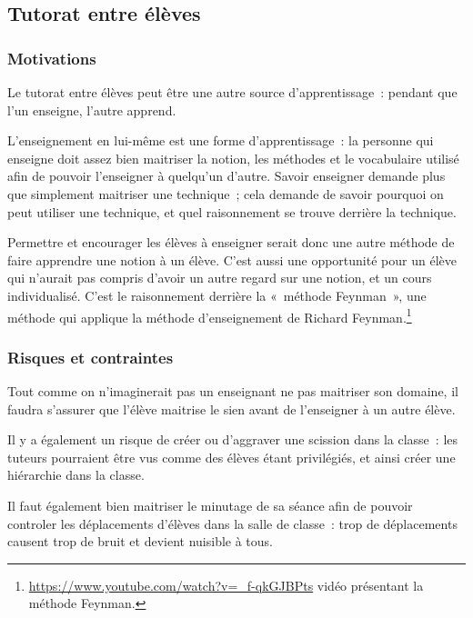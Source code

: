 \subsection{Tutorat entre élèves}
\subsubsection{Motivations}
Le tutorat entre élèves peut être une autre source d'apprentissage : pendant que
l'un enseigne, l'autre apprend.

L'enseignement en lui-même est une forme d'apprentissage : la personne qui
enseigne doit assez bien maitriser la notion, les méthodes et le vocabulaire
utilisé afin de pouvoir l'enseigner à quelqu'un d'autre. Savoir enseigner
demande plus que simplement maitriser une technique ; cela demande de savoir
pourquoi on peut utiliser une technique, et quel raisonnement se trouve derrière
la technique.

Permettre et encourager les élèves à enseigner serait donc une autre méthode de
faire apprendre une notion à un élève. C'est aussi une opportunité pour un élève
qui n'aurait pas compris d'avoir un autre regard sur une notion, et un cours
individualisé. C'est le raisonnement derrière la « méthode Feynman », une méthode
qui applique la méthode d'enseignement de Richard Feynman.\footnote{\url{https://www.youtube.com/watch?v=_f-qkGJBPts} vidéo présentant la méthode Feynman.}


\subsubsection{Risques et contraintes}
Tout comme on n'imaginerait pas un enseignant ne pas maitriser son domaine, il
faudra s'assurer que l'élève maitrise le sien avant de l'enseigner à un autre
élève.

Il y a également un risque de créer ou d'aggraver une scission dans la classe :
les tuteurs pourraient être vus comme des élèves étant privilégiés, et ainsi créer
une hiérarchie dans la classe.\cite{pedagogie_cooperative_hierarchie}

Il faut également bien maitriser le minutage de sa séance afin de pouvoir controler
les déplacements d'élèves dans la salle de classe : trop de déplacements causent
trop de bruit et devient nuisible à tous.

